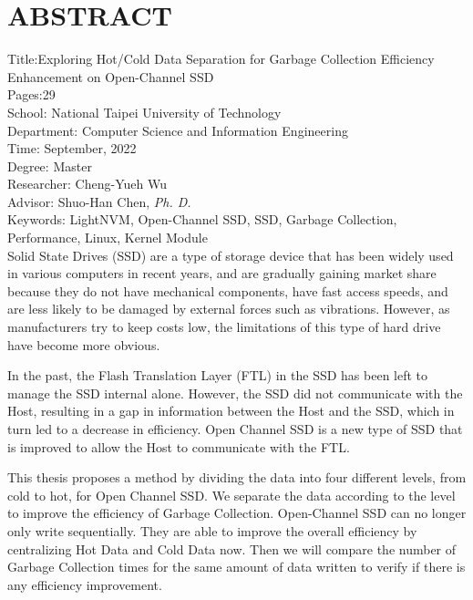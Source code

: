 \chapter*{ABSTRACT}


\noindent
Title:Exploring Hot/Cold Data Separation for Garbage Collection Efficiency Enhancement on Open-Channel SSD\\
Pages:29\\
School: National Taipei University of Technology\\
Department: Computer Science and Information Engineering\\
Time: September, 2022\\
Degree: Master\\
Researcher: Cheng-Yueh Wu\\
Advisor: Shuo-Han Chen, \textit{Ph. D.}\\
Keywords: LightNVM, Open-Channel SSD, SSD, Garbage Collection, Performance, Linux, Kernel Module\\

Solid State Drives (SSD) are a type of storage device that has been widely used in various computers in recent years, and are gradually gaining market share because they do not have mechanical components, have fast access speeds, and are less likely to be damaged by external forces such as vibrations. However, as manufacturers try to keep costs low, the limitations of this type of hard drive have become more obvious.

\indent
In the past, the Flash Translation Layer (FTL) in the SSD has been left to manage the SSD internal alone. However, the SSD did not communicate with the Host, resulting in a gap in information between the Host and the SSD, which in turn led to a decrease in efficiency. Open Channel SSD is a new type of SSD that is improved to allow the Host to communicate with the FTL.

\indent
This thesis proposes a method by dividing the data into four different levels, from cold to hot, for Open Channel SSD. We separate the data according to the level to improve the efficiency of Garbage Collection. Open-Channel SSD can no longer only write sequentially. They are able to improve the overall efficiency by centralizing Hot Data and Cold Data now. Then we will compare the number of Garbage Collection times for the same amount of data written to verify if there is any efficiency improvement.

